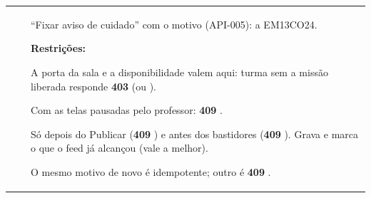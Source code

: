 \begin{tabularx}{\linewidth}{@{}L{40mm}L{24mm}X@{}}
\toprule
\headrow {} &  & \\
\midrule
\endhead
{} &  & \enquote{Fixar aviso de cuidado} com o motivo (API-005): a EM13CO24.\par \textbf{Restrições:}\par \hspace*{1em}\textbullet{} A porta da sala  e a disponibilidade  valem aqui: turma sem a missão liberada responde \textbf{403}  (ou ).\par \hspace*{1em}\textbullet{} Com as telas pausadas pelo professor: \textbf{409} .\par \hspace*{1em}\textbullet{} Só depois do Publicar (\textbf{409} ) e antes dos bastidores (\textbf{409} ). Grava e marca o que o feed já alcançou (vale a melhor).\par \hspace*{1em}\textbullet{} O mesmo motivo de novo é idempotente; outro é \textbf{409} .\\

\end{tabularx}
